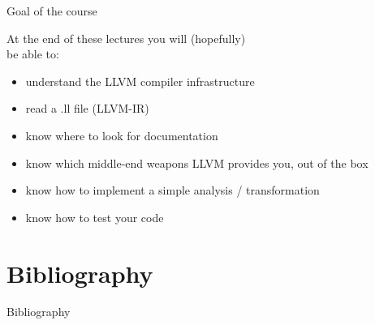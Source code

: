 \begin{frame}[t]{Goal of the course}
	\begin{center}
	\begin{varwidth}{8.5cm}
  At the end of these lectures you will (hopefully)\\ be able to:
  \medskip
  \begin{itemize}
    \item understand the LLVM compiler infrastructure
    \item read a .ll file (LLVM-IR)
    \item know where to look for documentation
    \item know which middle-end weapons
          LLVM provides you, out of the box
    \item know how to implement a simple analysis / transformation
    \item know how to test your code
  \end{itemize}
  \end{varwidth}
  \end{center}
\end{frame}

\section*{Bibliography}
\begin{frame}[allowframebreaks]{Bibliography}
\nocite{*}


\end{frame}


